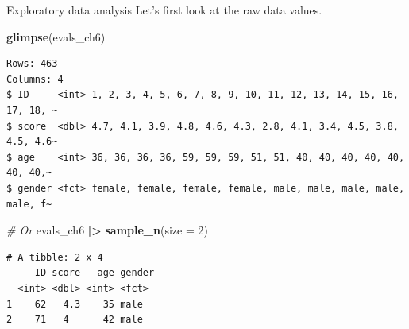 \documentclass[
  ignorenonframetext,
]{beamer}
\newenvironment{Shaded}{\begin{snugshade}}{\end{snugshade}}
\newcommand{\AttributeTok}[1]{\textcolor[rgb]{0.13,0.29,0.53}{#1}}
\newcommand{\CommentTok}[1]{\textcolor[rgb]{0.56,0.35,0.01}{\textit{#1}}}
\newcommand{\DecValTok}[1]{\textcolor[rgb]{0.00,0.00,0.81}{#1}}
\newcommand{\FunctionTok}[1]{\textcolor[rgb]{0.13,0.29,0.53}{\textbf{#1}}}
\newcommand{\NormalTok}[1]{#1}
\newcommand{\SpecialCharTok}[1]{\textcolor[rgb]{0.81,0.36,0.00}{\textbf{#1}}}
\begin{document}
\begin{frame}[fragile]{Exploratory data analysis}
\label{exploratory-data-analysis-9}
Let's first look at the raw data values.

\small

\begin{Shaded}
\begin{Highlighting}[]
\FunctionTok{glimpse}\NormalTok{(evals\_ch6)}
\end{Highlighting}
\end{Shaded}

\begin{verbatim}
Rows: 463
Columns: 4
$ ID     <int> 1, 2, 3, 4, 5, 6, 7, 8, 9, 10, 11, 12, 13, 14, 15, 16, 17, 18, ~
$ score  <dbl> 4.7, 4.1, 3.9, 4.8, 4.6, 4.3, 2.8, 4.1, 3.4, 4.5, 3.8, 4.5, 4.6~
$ age    <int> 36, 36, 36, 36, 59, 59, 59, 51, 51, 40, 40, 40, 40, 40, 40, 40,~
$ gender <fct> female, female, female, female, male, male, male, male, male, f~
\end{verbatim}

\begin{Shaded}
\begin{Highlighting}[]
\CommentTok{\# Or}
\NormalTok{evals\_ch6 }\SpecialCharTok{|\textgreater{}} 
  \FunctionTok{sample\_n}\NormalTok{(}\AttributeTok{size =} \DecValTok{2}\NormalTok{)}
\end{Highlighting}
\end{Shaded}

\begin{verbatim}
# A tibble: 2 x 4
     ID score   age gender
  <int> <dbl> <int> <fct> 
1    62   4.3    35 male  
2    71   4      42 male  
\end{verbatim}

\normalsize
\end{frame}
\end{document}
